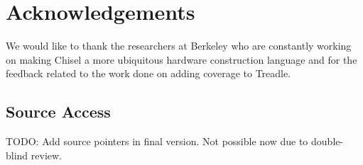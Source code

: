 \documentclass[conference]{IEEEtran}
\newcommand{\todo}[1]{{\color{olive} TODO: #1}}
\begin{document}
\section*{Acknowledgements}
We would like to thank the researchers at Berkeley who are constantly working on making Chisel a more ubiquitous hardware construction language and for the feedback related to the work done on adding coverage to Treadle.

\subsection*{Source Access}

\todo{Add source pointers in final version. Not possible now due to double-blind review.}



\end{document}

